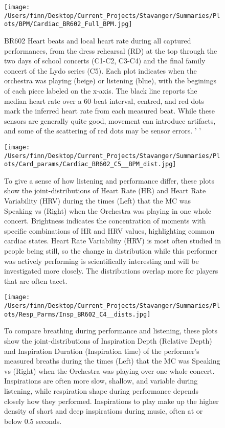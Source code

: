 \begin{figure}[h]
\begin{center}
\texttt{[image: /Users/finn/Desktop/Current\_Projects/Stavanger/Summaries/Plots/BPM/Cardiac\_BR602\_Full\_BPM.jpg]}
\caption{BR602 Heart beats and local heart rate during all captured performances, from the dress rehearsal (RD) at the top through the two days of school concerts (C1-C2, C3-C4) and the final family concert of the Lydo series (C5).  Each plot indicates when the orchestra was playing (beige) or listening (blue), with the beginings of each piece labeled on the x-axis.  The black line reports the median heart rate over a 60-beat interval, centred, and red dots mark the inferred heart rate from each measured beat. While these sensors are generally quite good, movement can introduce artifacts, and some of the scattering of red dots may be sensor errors. ' '}
\label{BPM}
\end{center}
\end{figure}
\begin{figure}[h]
\begin{center}
\texttt{[image: /Users/finn/Desktop/Current\_Projects/Stavanger/Summaries/Plots/Card\_params/Cardiac\_BR602\_C5\_\_BPM\_dist.jpg]}
\caption{To give a sense of how listening and performance differ, these plots show the joint-distributions of Heart Rate (HR) and Heart Rate Variability (HRV) during the times (Left) that the MC was Speaking vs (Right) when the Orchestra was playing in one whole concert.  Brightness indicates the concentration of moments with specific combinations of HR and HRV values, highlighting common cardiac states.  Heart Rate Variability (HRV) is most often studied in people being still, so the change in distribution while this performer was actively performing is scientifically interesting and will be investigated more closely. The distributions overlap more for players that are often tacet.}
\label{HRV}
\end{center}
\end{figure}
\begin{figure}[h]
\begin{center}
\texttt{[image: /Users/finn/Desktop/Current\_Projects/Stavanger/Summaries/Plots/Resp\_Parms/Insp\_BR602\_C4\_\_dists.jpg]}
\caption{To compare breathing during performance and listening, these plots show the joint-distributions of Inspiration Depth (Relative Depth) and Inspiration Duration (Inspiration time) of the performer's measured breaths during the times (Left) that the MC was Speaking vs (Right) when the Orchestra was playing over one whole concert.  Inspirations are often more slow, shallow, and variable during listening, while respiration shape during performance depends closely how they performed. Inspirations to play make up the higher density of short and deep inspirations during music, often at or below 0.5 seconds.}
\label{resp}
\end{center}
\end{figure}
